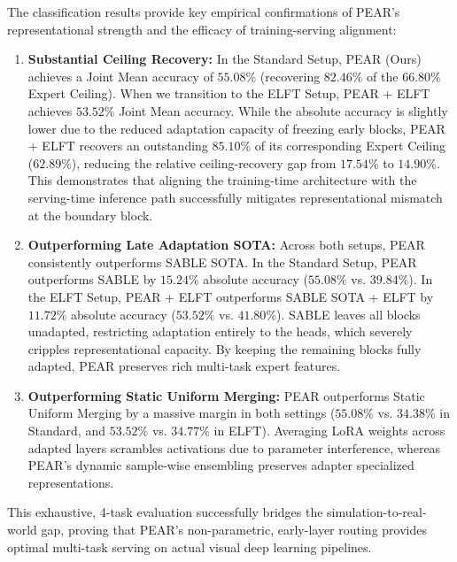 The classification results provide key empirical confirmations of PEAR's representational strength and the efficacy of training-serving alignment:
\begin{enumerate}
    \item \textbf{Substantial Ceiling Recovery:} In the Standard Setup, PEAR (Ours) achieves a Joint Mean accuracy of $\mathbf{55.08\%}$ (recovering $\mathbf{82.46\%}$ of the $\mathbf{66.80\%}$ Expert Ceiling). When we transition to the ELFT Setup, PEAR + ELFT achieves $\mathbf{53.52\%}$ Joint Mean accuracy. While the absolute accuracy is slightly lower due to the reduced adaptation capacity of freezing early blocks, PEAR + ELFT recovers an outstanding $\mathbf{85.10\%}$ of its corresponding Expert Ceiling ($\mathbf{62.89\%}$), reducing the relative ceiling-recovery gap from $17.54\%$ to $14.90\%$. This demonstrates that aligning the training-time architecture with the serving-time inference path successfully mitigates representational mismatch at the boundary block.
    \item \textbf{Outperforming Late Adaptation SOTA:} Across both setups, PEAR consistently outperforms SABLE SOTA. In the Standard Setup, PEAR outperforms SABLE by $\mathbf{15.24\%}$ absolute accuracy ($55.08\%$ vs. $39.84\%$). In the ELFT Setup, PEAR + ELFT outperforms SABLE SOTA + ELFT by $\mathbf{11.72\%}$ absolute accuracy ($53.52\%$ vs. $41.80\%$). SABLE leaves all blocks unadapted, restricting adaptation entirely to the heads, which severely cripples representational capacity. By keeping the remaining blocks fully adapted, PEAR preserves rich multi-task expert features.
    \item \textbf{Outperforming Static Uniform Merging:} PEAR outperforms Static Uniform Merging by a massive margin in both settings ($55.08\%$ vs. $34.38\%$ in Standard, and $53.52\%$ vs. $34.77\%$ in ELFT). Averaging LoRA weights across adapted layers scrambles activations due to parameter interference, whereas PEAR's dynamic sample-wise ensembling preserves adapter specialized representations.
\end{enumerate}
This exhaustive, 4-task evaluation successfully bridges the simulation-to-real-world gap, proving that PEAR's non-parametric, early-layer routing provides optimal multi-task serving on actual visual deep learning pipelines.

